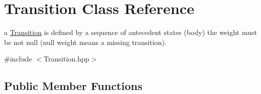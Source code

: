 \hypertarget{classTransition}{}\section{Transition Class Reference}
\label{classTransition}


a \mbox{\hyperlink{classTransition}{Transition}} is defined by a sequence of antecedent states (body) the weight must be not null (null weight means a missing transition).  




{\ttfamily \#include $<$Transition.\+hpp$>$}

\subsection*{Public Member Functions}
